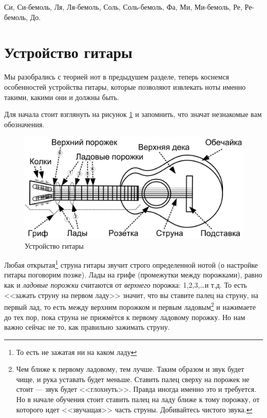 \begin{center}
Си, Си-бемоль, Ля, Ля-бемоль, Соль, Соль-бемоль, Фа, Ми, Ми-бемоль, Ре, Ре-бемоль, До.
\end{center}


\section{Устройство гитары}

Мы разобрались с теорией нот в предыдушем разделе, теперь коснемся особенностей устройства гитары, которые позволяют извлекать ноты именно такими, какими они и должны быть. 

Для начала стоит взглянуть на рисунок \ref{fig:guitarConstruction} и запомнить, что значат незнакомые вам обозначения.

\begin{figure}[!ht]
    \centering
    \includegraphics{fig/guitar-construction} 
    \caption{Устройство гитары}\label{fig:guitarConstruction}
\end{figure} 

Любая открытая\footnote{То есть не зажатая ни на каком ладу} струна гитары звучит строго определенной нотой (о настройке гитары поговорим позже). Лады на грифе (промежутки между порожками), равно как и \emph{ладовые порожки} считаются от \emph{верхнего} порожка: 1,2,3,\ldots и т.д. То есть <<зажать струну на первом ладу>> значит, что вы ставите палец на струну, на первый лад, то есть между верхним порожком и первым ладовым\footnote{Чем ближе к первому ладовому, тем лучше. Таким образом и звук будет чище, и рука уставать будет меньше. Ставить палец сверху на порожек не стоит --- звук будет <<глохнуть>>. Правда иногда именно это и требуется. Но в начале обучения стоит ставить палец на ладу ближе к тому порожку, от которого идет <<звучащая>> часть струны. Добивайтесь чистого звука.} и нажимаете до тех пор, пока струна не прижмётся к первому ладовому порожку. Но нам важно сейчас не то, как правильно зажимать струну. 

